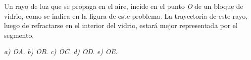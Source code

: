 
Un rayo de luz que se propaga en el aire, incide en el punto \textit{O} de un bloque de vidrio, como se indica en la figura de este problema. La trayectoria de este rayo, luego de refractarse en el interior del vidrio, estará mejor representada por el segmento.

\textit{a) OA}. \textit{b) OB}. \textit{c) OC}.  \textit{d) OD}. \textit{e) OE}.
